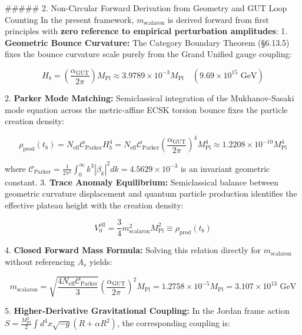 \documentclass[11pt,a4paper]{article}
\theoremstyle{definition}
\theoremstyle{remark}
\begin{document}
\#\#\#\#\# 2. Non-Circular Forward Derivation from Geometry and GUT Loop Counting
In the present framework, $m_{\text{scalaron}}$ is derived forward from first principles with \textbf{zero reference to empirical perturbation amplitudes}:
1. \textbf{Geometric Bounce Curvature:} The Category Boundary Theorem (\S 6.13.5) fixes the bounce curvature scale purely from the Grand Unified gauge coupling:


\begin{equation}
H_b = \left(\frac{\alpha_{\text{GUT}}}{2\pi}\right) M_{\text{Pl}} \approx 3.9789 \times 10^{-3} M_{\text{Pl}} \quad (9.69 \times 10^{15}\text{ GeV})
\end{equation}


2. \textbf{Parker Mode Matching:} Semiclassical integration of the Mukhanov-Sasaki mode equation across the metric-affine ECSK torsion bounce fixes the particle creation density:


\begin{equation}
\rho_{\text{prod}}(t_b) = N_{\text{eff}} \mathcal{C}_{\text{Parker}} H_b^4 = N_{\text{eff}} \mathcal{C}_{\text{Parker}} \left(\frac{\alpha_{\text{GUT}}}{2\pi}\right)^4 M_{\text{Pl}}^4 \approx 1.2208 \times 10^{-10} M_{\text{Pl}}^4
\end{equation}


where $\mathcal{C}_{\text{Parker}} = \frac{1}{2\pi^2} \int_0^\infty k^3 |\beta_k|^2 dk = 4.5629 \times 10^{-3}$ is an invariant geometric constant.
3. \textbf{Trace Anomaly Equilibrium:} Semiclassical balance between geometric curvature displacement and quantum particle production identifies the effective plateau height with the creation density:


\begin{equation}
V_0^{\text{eff}} = \frac{3}{4} m_{\text{scalaron}}^2 M_{\text{Pl}}^2 \equiv \rho_{\text{prod}}(t_b)
\end{equation}


4. \textbf{Closed Forward Mass Formula:} Solving this relation directly for $m_{\text{scalaron}}$ without referencing $A_s$ yields:


\begin{equation}
\boxed{m_{\text{scalaron}} = \sqrt{\frac{4 N_{\text{eff}} \mathcal{C}_{\text{Parker}}}{3}} \left(\frac{\alpha_{\text{GUT}}}{2\pi}\right)^2 M_{\text{Pl}} = 1.2758 \times 10^{-5} M_{\text{Pl}} = 3.107 \times 10^{13}\text{ GeV}}
\end{equation}


5. \textbf{Higher-Derivative Gravitational Coupling:} In the Jordan frame action $S = \frac{M_{\text{Pl}}^2}{2} \int d^4 x \sqrt{-g} (R + \alpha R^2)$, the corresponding coupling is:
\end{document}
